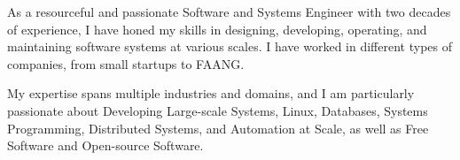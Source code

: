
\begin{cvparagraph}

As a resourceful and passionate Software and Systems Engineer with two decades of experience, I have honed my skills in
designing, developing, operating, and maintaining software systems at various scales. I have worked in different types
of companies, from small startups to FAANG.

My expertise spans multiple industries and domains, and I am particularly passionate about Developing Large-scale
Systems, Linux, Databases, Systems Programming, Distributed Systems, and Automation at Scale, as well as Free Software
and Open-source Software.
\end{cvparagraph}
